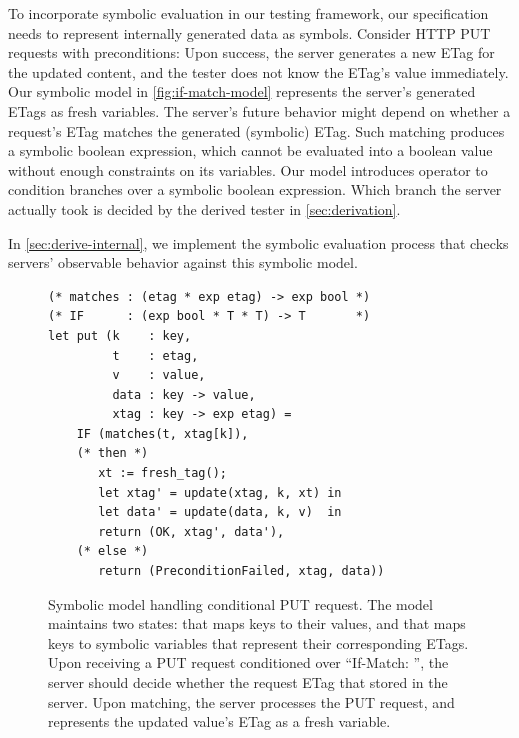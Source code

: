 To incorporate symbolic evaluation in our testing framework, our specification
needs to represent internally generated data as symbols.  Consider HTTP
PUT requests with  preconditions: Upon success, the server
generates a new ETag for the updated content, and the tester does not know the
ETag's value immediately.  Our symbolic model in \autoref{fig:if-match-model}
represents the server's generated ETags as fresh variables.  The server's future
behavior might depend on whether a request's ETag matches the generated
(symbolic) ETag.  Such matching produces a symbolic boolean expression, which
cannot be evaluated into a boolean value without enough constraints on its
variables.  Our model introduces  operator to condition branches over
a symbolic boolean expression.  Which branch the server actually took is decided
by the derived tester in \autoref{sec:derivation}.

In \autoref{sec:derive-internal}, we implement the symbolic evaluation process
that checks servers' observable behavior against this symbolic model.

\begin{figure}
\begin{lstlisting}[style=customcoq]
(* matches : (etag * exp etag) -> exp bool *)
(* IF      : (exp bool * T * T) -> T       *)
let put (k    : key,
         t    : etag,
         v    : value,
         data : key -> value,
         xtag : key -> exp etag) =
    IF (matches(t, xtag[k]),
    (* then *)
       xt := fresh_tag();
       let xtag' = update(xtag, k, xt) in
       let data' = update(data, k, v)  in
       return (OK, xtag', data'),
    (* else *)
       return (PreconditionFailed, xtag, data))
\end{lstlisting}
\caption{Symbolic model handling conditional PUT request.  The model maintains
  two states:  that maps keys to their values, and  that
  maps keys to symbolic variables that represent their corresponding ETags.
  Upon receiving a PUT request conditioned over ``If-Match: '', the
  server should decide whether the request ETag  that stored in the
  server.  Upon matching, the server processes the PUT request, and represents
  the updated value's ETag as a fresh variable.
}
\label{fig:if-match-model}
\end{figure}

